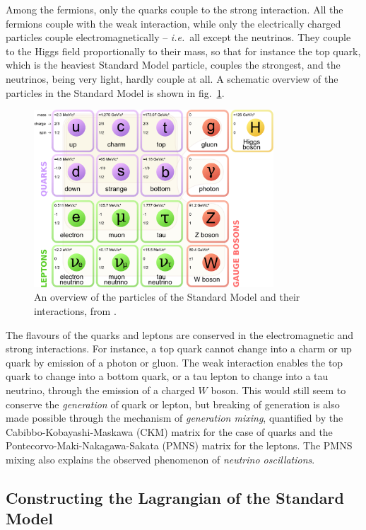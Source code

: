 Among the fermions, only the quarks couple to the strong interaction. All the fermions couple with the weak interaction, while only the electrically charged particles couple electromagnetically -- {\it i.e.}\ all except the neutrinos. They couple to the Higgs field proportionally to their mass, so that for instance the top quark, which is the heaviest Standard Model particle, couples the strongest, and the neutrinos, being very light, hardly couple at all. A schematic overview of the particles in the Standard Model is shown in fig.\ \ref{fig:SM_particles}.
\begin{figure}[hbt]
	\centering
	\includegraphics[width=0.8\textwidth]{figures/susyintro/Standard_Model_of_Elementary_Particles.pdf}
	\caption{An overview of the particles of the Standard Model and their interactions, from \cite{Wikimedia_SM_particles}.}
	\label{fig:SM_particles}
\end{figure}

The flavours of the quarks and leptons are conserved in the electromagnetic and strong interactions. For instance, a top quark cannot change into a charm or up quark by emission of a photon or gluon. The weak interaction enables the top quark to change into a bottom quark, or a tau lepton to change into a tau neutrino, through the emission of a charged $W$ boson. This would still seem to conserve the {\it generation} of quark or lepton, but breaking of generation is also made possible through the mechanism of {\it generation mixing}, quantified by the Cabibbo-Kobayashi-Maskawa (CKM) matrix for the case of quarks and the Pontecorvo-Maki-Nakagawa-Sakata (PMNS) matrix for the leptons. The PMNS mixing also explains the observed phenomenon of {\it neutrino oscillations}.

\subsection{Constructing the Lagrangian of the Standard Model}

